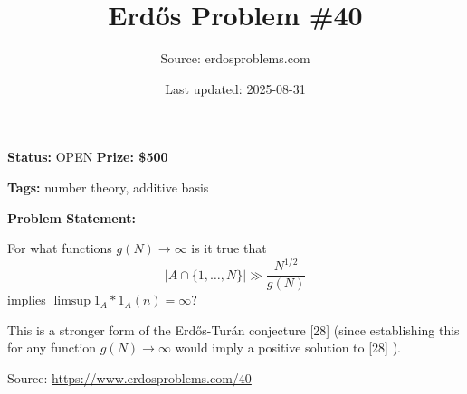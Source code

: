 \documentclass{article}
\title{Erd\H{o}s Problem \#40}
\date{Last updated: 2025-08-31}
\author{Source: erdosproblems.com}
\begin{document}
\maketitle

\noindent\textbf{Status:} OPEN \quad \textbf{Prize: \$500}

\noindent\textbf{Tags:} number theory, additive basis

\medskip

\noindent\textbf{Problem Statement:}

For what functions $g(N)\to \infty$ is it true that\[\lvert A\cap \{1,\ldots,N\}\rvert \gg \frac{N^{1/2}}{g(N)}\]implies $\limsup 1_A\ast 1_A(n)=\infty$?




This is a stronger form of the Erd\H{o}s-Tur\'{a}n conjecture [28] (since establishing this for any function $g(N)\to \infty$ would imply a positive solution to [28] ).


\bigskip
\noindent\small{Source: \url{https://www.erdosproblems.com/40}}
\end{document}
